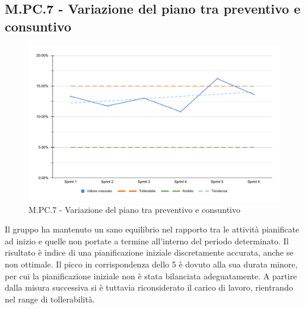 \subsection{M.PC.7 - Variazione del piano tra preventivo e consuntivo}
\begin{figure}[H]
    \centering
    \includegraphics[width=\textwidth]{assets/variazione_task_completati.pdf}
    \caption{M.PC.7 - Variazione del piano tra preventivo e consuntivo}
\end{figure}

\par Il gruppo ha mantenuto un sano equilibrio nel rapporto tra le attività pianificate ad inizio  e quelle non portate a termine all'interno del periodo determinato. Il risultato è indice di una pianificazione iniziale discretamente accurata, anche se non ottimale. Il picco in corrispondenza dello  5 è dovuto alla sua durata minore, per cui la pianificazione iniziale non è stata bilanciata adeguatamente. A partire dalla misura successiva si è tuttavia riconsiderato il carico di lavoro, rientrando nel range di tollerabilità.